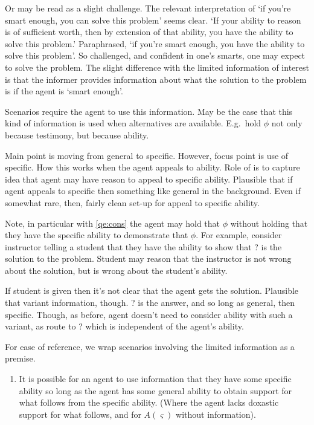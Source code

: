 \begin{note}
  Or may be read as a slight challenge.
  The relevant interpretation of `if you're smart enough, you can solve this problem' seems clear.
  `If your ability to reason is of sufficient worth, then by extension of that ability, you have the ability to solve this problem.'
  Paraphrased, `if you're smart enough, you have the ability to solve this problem'.
  So challenged, and confident in one's smarts, one may expect to solve the problem.
  The slight difference with the limited information of interest is that the informer provides information about what the solution to the problem is if the agent is `smart enough'.

  Scenarios require the agent to use this information.
  May be the case that this kind of information is used when alternatives are available.
  E.g.\ hold \(\phi\) not only because testimony, but because ability.

  Main point is moving from general to specific.
  However, focus point is use of specific.
  How this works when the agent appeals to ability.
  Role of \GSI{} is to capture idea that agent may have reason to appeal to specific ability.
  Plausible that if agent appeals to specific then something like general in the background.
  Even if somewhat rare, then, fairly clean set-up for appeal to specific ability.

  Note, in particular with \ref{qe:cons} the agent may hold that \(\phi\) without holding that they have the specific ability to demonstrate that \(\phi\).
  For example, consider instructor telling a student that they have the ability to show that ? is the solution to the problem.
  Student may reason that the instructor is not wrong about the solution, but is wrong about the student's ability.

  If student is given \GSI{} then it's not clear that the agent gets the solution.
  Plausible that variant information, though.
  ? is the answer, and so long as general, then specific.
  Though, as before, agent doesn't need to consider ability with such a variant, as route to ? which is independent of the agent's ability.
\end{note}

\begin{note}
  For ease of reference, we wrap scenarios involving the limited information as a premise.
  \begin{enumerate}[label=\eA{}, ref=\eA{}]
  \item\label{prem:ab} It is possible for an agent to use information that they have some specific ability so long as the agent has some general ability to obtain support for what follows from the specific ability.
    (Where the agent lacks doxastic support for what follows, and for \(A(\varsigma)\) without information).
  \end{enumerate}
\end{note}

